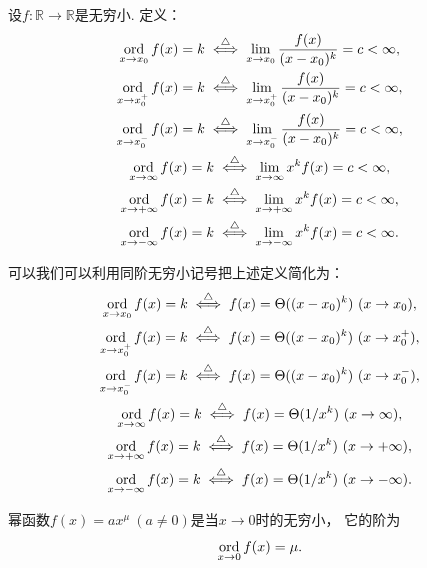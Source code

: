 \begin{definition}
设\(f\colon\mathbb{R}\to\mathbb{R}\)是无穷小.
定义：\begin{gather*}
	\operatorname*{ord}_{x \to x_0} f(x) = k
	\overset{\triangle}{\iff}
	\lim_{x \to x_0} \frac{f(x)}{(x-x_0)^k} = c < \infty, \\
	\operatorname*{ord}_{x \to x_0^+} f(x) = k
	\overset{\triangle}{\iff}
	\lim_{x \to x_0^+} \frac{f(x)}{(x-x_0)^k} = c < \infty, \\
	\operatorname*{ord}_{x \to x_0^-} f(x) = k
	\overset{\triangle}{\iff}
	\lim_{x \to x_0^-} \frac{f(x)}{(x-x_0)^k} = c < \infty, \\
	\operatorname*{ord}_{x \to \infty} f(x) = k
	\overset{\triangle}{\iff}
	\lim_{x \to \infty} x^k f(x) = c < \infty, \\
	\operatorname*{ord}_{x \to +\infty} f(x) = k
	\overset{\triangle}{\iff}
	\lim_{x \to +\infty} x^k f(x) = c < \infty, \\
	\operatorname*{ord}_{x \to -\infty} f(x) = k
	\overset{\triangle}{\iff}
	\lim_{x \to -\infty} x^k f(x) = c < \infty.
\end{gather*}
\end{definition}
\begin{remark}
可以我们可以利用同阶无穷小记号把上述定义简化为：\begin{gather*}
	\operatorname*{ord}_{x \to x_0} f(x) = k
	\overset{\triangle}{\iff}
	f(x) = \Theta((x-x_0)^k)\ (x \to x_0), \\
	\operatorname*{ord}_{x \to x_0^+} f(x) = k
	\overset{\triangle}{\iff}
	f(x) = \Theta((x-x_0)^k)\ (x \to x_0^+), \\
	\operatorname*{ord}_{x \to x_0^-} f(x) = k
	\overset{\triangle}{\iff}
	f(x) = \Theta((x-x_0)^k)\ (x \to x_0^-), \\
	\operatorname*{ord}_{x \to \infty} f(x) = k
	\overset{\triangle}{\iff}
	f(x) = \Theta(1/x^k)\ (x \to \infty), \\
	\operatorname*{ord}_{x \to +\infty} f(x) = k
	\overset{\triangle}{\iff}
	f(x) = \Theta(1/x^k)\ (x \to +\infty), \\
	\operatorname*{ord}_{x \to -\infty} f(x) = k
	\overset{\triangle}{\iff}
	f(x) = \Theta(1/x^k)\ (x \to -\infty).
\end{gather*}
\end{remark}
\begin{example}
幂函数\(f(x) = a x^\mu\ (a\neq0)\)是当\(x\to0\)时的无穷小，
它的阶为\begin{equation*}
	\operatorname*{ord}_{x\to0} f(x) = \mu.
\end{equation*}
\end{example}

